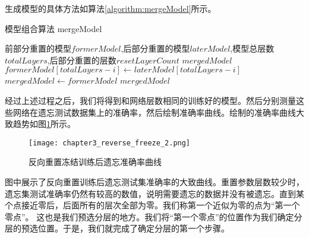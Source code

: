 
生成模型的具体方法如算法\ref{algorithm:mergeModel}所示。
\begin{algorithm}
	\renewcommand{\algorithmicrequire}{\textbf{Input:}}
	\renewcommand{\algorithmicensure}{\textbf{Output:}}
	\caption{模型组合算法 mergeModel}
	\label{algorithm:mergeModel}
	\begin{algorithmic}[1]
        \REQUIRE 前部分重置的模型$formerModel$,后部分重置的模型$laterModel$,模型总层数$totalLayers$,后部分重置的层数$resetLayerCount$
        \ENSURE  $mergedModel$
            \STATE $formerModel[totalLayers - i] \gets laterModel[totalLayers - i]$
        \ENDFOR
        \STATE $mergedModel \gets formerModel$
        \RETURN $mergedModel$
	\end{algorithmic}  
\end{algorithm}

经过上述过程之后，我们将得到和网络层数相同的训练好的模型。然后分别测量这些网络在遗忘测试数据集上的准确率，然后绘制准确率曲线。绘制的准确率曲线大致趋势如图\ref{fig:chapter3_reverse_freeze_2}所示。
\begin{figure}
    \centering
    \texttt{[image: chapter3\_reverse\_freeze\_2.png]}
    \caption{反向重置冻结训练后遗忘准确率曲线}
    \label{fig:chapter3_reverse_freeze_2}
\end{figure}
图中展示了反向重置训练后遗忘测试集准确率的大致曲线。重置参数层数较少时，遗忘集测试准确率仍然有较高的数值，说明需要遗忘的数据并没有被遗忘。直到某个点接近零后，后面所有的层次全部为零。我们称第一个近似为零的点为“第一个零点”。
这也是我们预选分层的地方。我们将“第一个零点”的位置作为我们确定分层的预选位置。于是，我们就完成了确定分层的第一个步骤。

